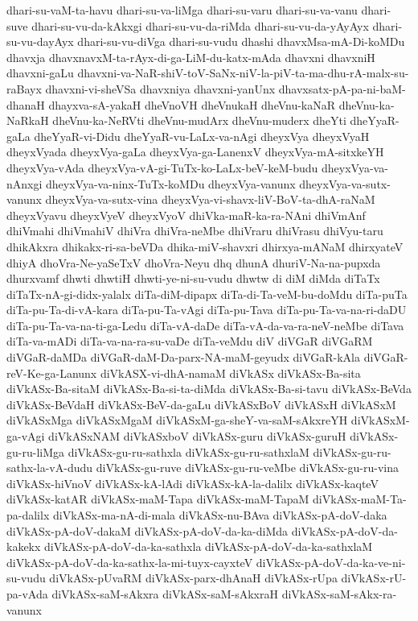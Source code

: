 {dhari-su-vaM-ta-havu
dhari-su-va-liMga
dhari-su-varu
dhari-su-va-vanu
dhari-suve
dhari-su-vu-da-kAkxgi
dhari-su-vu-da-riMda
dhari-su-vu-da-yAyAyx
dhari-su-vu-dayAyx
dhari-su-vu-diVga
dhari-su-vudu
dhashi
dhavxMsa-mA-Di-koMDu
dhavxja
dhavxnavxM-ta-rAyx-di-ga-LiM-du-katx-mAda
dhavxni
dhavxniH
dhavxni-gaLu
dhavxni-va-NaR-shiV-toV-SaNx-niV-la-piV-ta-ma-dhu-rA-malx-su-raBayx
dhavxni-vi-sheVSa
dhavxniya
dhavxni-yanUnx
dhavxsatx-pA-pa-ni-baM-dhanaH
dhayxva-sA-yakaH
dheVnoVH
dheVnukaH
dheVnu-kaNaR
dheVnu-ka-NaRkaH
dheVnu-ka-NeRVti
dheVnu-mudArx
dheVnu-muderx
dheYti
dheYyaR-gaLa
dheYyaR-vi-Didu
dheYyaR-vu-LaLx-va-nAgi
dheyxVya
dheyxVyaH
dheyxVyada
dheyxVya-gaLa
dheyxVya-ga-LanenxV
dheyxVya-mA-sitxkeYH
dheyxVya-vAda
dheyxVya-vA-gi-TuTx-ko-LaLx-beV-keM-budu
dheyxVya-va-nAnxgi
dheyxVya-va-ninx-TuTx-koMDu
dheyxVya-vanunx
dheyxVya-va-sutx-vanunx
dheyxVya-va-sutx-vina
dheyxVya-vi-shavx-liV-BoV-ta-dhA-raNaM
dheyxVyavu
dheyxVyeV
dheyxVyoV
dhiVka-maR-ka-ra-NAni
dhiVmAnf
dhiVmahi
dhiVmahiV
dhiVra
dhiVra-neMbe
dhiVraru
dhiVrasu
dhiVyu-taru
dhikAkxra
dhikakx-ri-sa-beVDa
dhika-miV-shavxri
dhirxya-mANaM
dhirxyateV
dhiyA
dhoVra-Ne-yaSeTxV
dhoVra-Neyu
dhq
dhunA
dhuriV-Na-na-pupxda
dhurxvamf
dhwti
dhwtiH
dhwti-ye-ni-su-vudu
dhwtw
di
diM
diMda
diTaTx
diTaTx-nA-gi-didx-yalalx
diTa-diM-dipapx
diTa-di-Ta-veM-bu-doMdu
diTa-puTa
diTa-pu-Ta-di-vA-kara
diTa-pu-Ta-vAgi
diTa-pu-Tava
diTa-pu-Ta-va-na-ri-daDU
diTa-pu-Ta-va-na-ti-ga-Ledu
diTa-vA-daDe
diTa-vA-da-va-ra-neV-neMbe
diTava
diTa-va-mADi
diTa-va-na-ra-su-vaDe
diTa-veMdu
diV
diVGaR
diVGaRM
diVGaR-daMDa
diVGaR-daM-Da-parx-NA-maM-geyudx
diVGaR-kAla
diVGaR-reV-Ke-ga-Lanunx
diVkASX-vi-dhA-namaM
diVkASx
diVkASx-Ba-sita
diVkASx-Ba-sitaM
diVkASx-Ba-si-ta-diMda
diVkASx-Ba-si-tavu
diVkASx-BeVda
diVkASx-BeVdaH
diVkASx-BeV-da-gaLu
diVkASxBoV
diVkASxH
diVkASxM
diVkASxMga
diVkASxMgaM
diVkASxM-ga-sheY-va-saM-sAkxreYH
diVkASxM-ga-vAgi
diVkASxNAM
diVkASxboV
diVkASx-guru
diVkASx-guruH
diVkASx-gu-ru-liMga
diVkASx-gu-ru-sathxla
diVkASx-gu-ru-sathxlaM
diVkASx-gu-ru-sathx-la-vA-dudu
diVkASx-gu-ruve
diVkASx-gu-ru-veMbe
diVkASx-gu-ru-vina
diVkASx-hiVnoV
diVkASx-kA-lAdi
diVkASx-kA-la-dalilx
diVkASx-kaqteV
diVkASx-katAR
diVkASx-maM-Tapa
diVkASx-maM-TapaM
diVkASx-maM-Ta-pa-dalilx
diVkASx-ma-nA-di-mala
diVkASx-nu-BAva
diVkASx-pA-doV-daka
diVkASx-pA-doV-dakaM
diVkASx-pA-doV-da-ka-diMda
diVkASx-pA-doV-da-kakekx
diVkASx-pA-doV-da-ka-sathxla
diVkASx-pA-doV-da-ka-sathxlaM
diVkASx-pA-doV-da-ka-sathx-la-mi-tuyx-cayxteV
diVkASx-pA-doV-da-ka-ve-ni-su-vudu
diVkASx-pUvaRM
diVkASx-parx-dhAnaH
diVkASx-rUpa
diVkASx-rU-pa-vAda
diVkASx-saM-sAkxra
diVkASx-saM-sAkxraH
diVkASx-saM-sAkx-ra-vanunx
}
